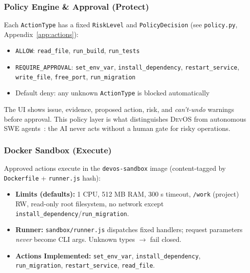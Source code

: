 \documentclass[conference,10pt,caption=false]{IEEEtran}
\newcommand{\devos}{\textsc{DevOS}\xspace}
\begin{document}
\subsubsection{Policy Engine \& Approval (Protect)}
\label{sec:policy}
Each \texttt{ActionType} has a fixed \texttt{RiskLevel} and \texttt{PolicyDecision} (see \texttt{policy.py}, Appendix~\ref{app:actions}):
\begin{itemize}[leftmargin=*, nosep]
    \item \texttt{ALLOW}: \texttt{read\_file}, \texttt{run\_build}, \texttt{run\_tests}
    \item \texttt{REQUIRE\_APPROVAL}: \texttt{set\_env\_var}, \texttt{install\_dependency}, \texttt{restart\_service}, \texttt{write\_file}, \texttt{free\_port}, \texttt{run\_migration}
    \item Default deny: any unknown \texttt{ActionType} is blocked automatically
\end{itemize}
The UI shows issue, evidence, proposed action, risk, and \textit{can't-undo} warnings before approval. This policy layer is what distinguishes \devos from autonomous SWE agents~\cite{swe-agent, devin}: the AI never acts without a human gate for risky operations.

\subsubsection{Docker Sandbox (Execute)}
\label{sec:sandbox}
Approved actions execute in the \texttt{devos-sandbox} image (content-tagged by \texttt{Dockerfile} + \texttt{runner.js} hash):
\begin{itemize}[leftmargin=*, nosep]
    \item \textbf{Limits (defaults):} 1 CPU, 512 MB RAM, 300 s timeout, \texttt{/work} (project) RW, read-only root filesystem, no network except \texttt{install\_dependency}/\texttt{run\_migration}.
    \item \textbf{Runner:} \texttt{sandbox/runner.js} dispatches fixed handlers; request parameters \textit{never} become CLI args. Unknown types $\to$ fail closed.
    \item \textbf{Actions Implemented:} \texttt{set\_env\_var}, \texttt{install\_dependency}, \texttt{run\_migration}, \texttt{restart\_service}, \texttt{read\_file}.
\end{itemize}
\end{document}
